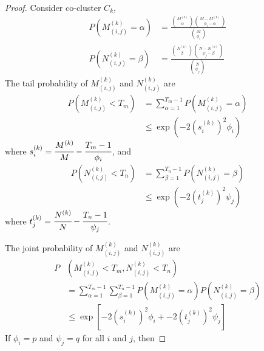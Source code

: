\documentclass[letterpaper, 10 pt, conference]{ieeeconf}  %
\begin{document}
\begin{proof}
    Consider co-cluster $C_k$,
    \begin{equation}
        \begin{split}
            P(M_{(i,j)}^{(k)} = \alpha) & = \frac{\binom{M^{(k)}}{\alpha} \binom{M-M^{(k)}}{\phi_i-\alpha}}{\binom{M}{\phi_i}} \\
            P(N_{(i,j)}^{(k)} = \beta)  & = \frac{\binom{N^{(k)}}{\beta} \binom{N-N^{(k)}}{\psi_j-\beta}}{\binom{N}{\psi_j}}
        \end{split}
    \end{equation}
    The tail probability of $M_{(i,j)}^{(k)}$ and $N_{(i,j)}^{(k)}$ are
    \begin{equation}
        \begin{split}
            P(M_{(i,j)}^{(k)} < T_m) & = \sum_{\alpha=1}^{T_m-1} P(M_{(i,j)}^{(k)} = \alpha) \\
                                     & \le \exp(-2 (s_i^{(k)})^2 \phi_i)
        \end{split}
    \end{equation}
    where $s_i^{(k)} = \cfrac{M^{(k)}}{M}-\cfrac{T_m-1}{\phi_i}$, and
    \begin{equation}
        \begin{split}
            P(N_{(i,j)}^{(k)} < T_n) & = \sum_{\beta=1}^{T_n-1} P(N_{(i,j)}^{(k)} = \beta) \\
                                     & \le \exp (-2 (t_j^{(k)})^2 \psi_j)
        \end{split}
    \end{equation}
    where $t_j^{(k)} = \cfrac{N^{(k)}}{N}-\cfrac{T_n-1}{\psi_j}$.

    The joint probability of $M_{(i,j)}^{(k)}$ and $N_{(i,j)}^{(k)}$ are
    \begin{equation}
        \begin{split}
            P & (M_{(i,j)}^{(k)} < T_m, N_{(i,j)}^{(k)} < T_n)              \\ & = \sum_{\alpha=1}^{T_m-1} \sum_{\beta=1}^{T_n-1} P(M_{(i,j)}^{(k)} = \alpha) P(N_{(i,j)}^{(k)} = \beta) \\
              & \le \exp[-2 (s_i^{(k)})^2 \phi_i + -2 (t_j^{(k)})^2 \psi_j]
        \end{split}
    \end{equation}
    If $\phi_i = p$ and $\psi_j = q$ for all $i$ and $j$, then


\end{proof}
\end{document}
